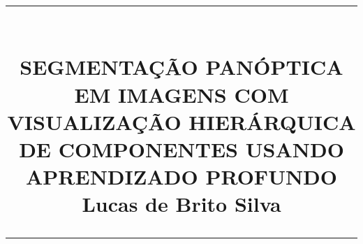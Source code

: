 \newcommand{\HRule}[1]{\rule{\linewidth}{#1}}
\begin{titlepage}
    \title{
		\HRule{0.5pt} \\  [0.75cm]
		\LARGE \textbf{\uppercase{SEGMENTAÇÃO PANÓPTICA EM IMAGENS COM VISUALIZAÇÃO HIERÁRQUICA DE COMPONENTES USANDO APRENDIZADO PROFUNDO}} \\ [1.3cm]
		\large \textbf{Lucas de Brito Silva} \\ [0.5cm]
		\HRule{1.5pt} \\ [0.5cm]
		\normalsize \vspace*{5\baselineskip}
	}

	\date{}

    \maketitle
    \thispagestyle{empty}
\end{titlepage}